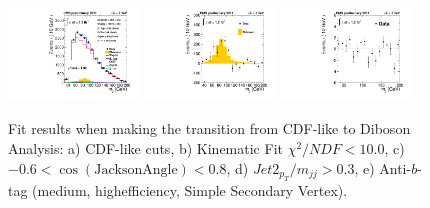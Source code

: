 \begin{figure}[h!]
{%
\linewidth
\includegraphics[width=0.31\textwidth]{figs/CDFtoWW_s4_mJJ-combined-fit.pdf} 
\linewidth
\includegraphics[width=0.31\textwidth]{figs/CDFtoWW_s4_mJJ-combined-fit-subtracted.pdf} 
\linewidth
\includegraphics[width=0.31\textwidth]{figs/CDFtoWW_s4_mJJ-combined-fit-residual.pdf} \\
\caption{Fit results when making the transition from CDF-like to Diboson Analysis: a) CDF-like cuts, b) Kinematic Fit $\chi^2/NDF<10.0$, c) $-0.6<\cos (\textrm{JacksonAngle})<0.8$, d) $Jet2_{p_T}/m_{jj}>0.3$, e) Anti-$b$-tag (medium, highefficiency, Simple Secondary Vertex).} 
\label{fig:CDFtoWWcuts}}
\end{figure}
